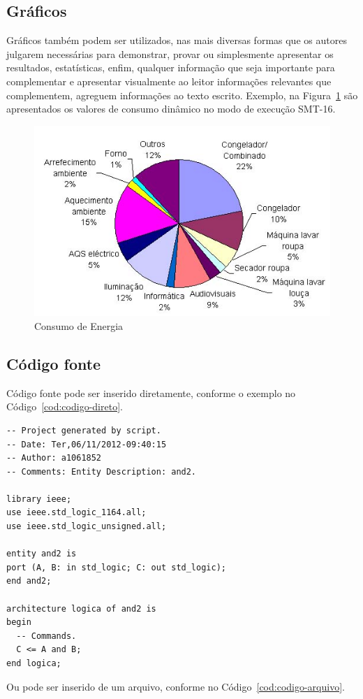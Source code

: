\documentclass[times, 10pt,twocolumn]{article}
\begin{document}
\subsection{Gráficos}
Gráficos também podem ser utilizados, nas mais diversas formas que os autores julgarem necessárias para demonstrar, provar ou simplesmente apresentar os resultados, estatísticas, enfim, qualquer informação que seja importante para complementar e apresentar visualmente ao leitor informações relevantes que complementem, agreguem informações ao texto escrito. Exemplo, na Figura~{\ref{fig:figura-002}} são apresentados os valores de consumo dinâmico no modo de execução SMT-16.

\begin{figure}[H]
    \centering
    \includegraphics[width=.5\textwidth]{figuras/consumo.jpg}
    \caption{Consumo de Energia}
    \label{fig:figura-002}
\end{figure}

\subsection{Código fonte}

Código fonte pode ser inserido diretamente, conforme o exemplo no Código~{\ref{cod:codigo-direto}}.

\begin{lstlisting}[label=cod:codigo-direto,caption=Descrição VHDL de uma Porta AND de duas entradas.]
-- Project generated by script.
-- Date: Ter,06/11/2012-09:40:15
-- Author: a1061852
-- Comments: Entity Description: and2.
 
library ieee;
use ieee.std_logic_1164.all;
use ieee.std_logic_unsigned.all;
 
entity and2 is
port (A, B: in std_logic; C: out std_logic);
end and2;
 
architecture logica of and2 is
begin
  -- Commands.
  C <= A and B;
end logica;
\end{lstlisting}

Ou pode ser inserido de um arquivo, conforme no Código~{\ref{cod:codigo-arquivo}}.
\end{document}

